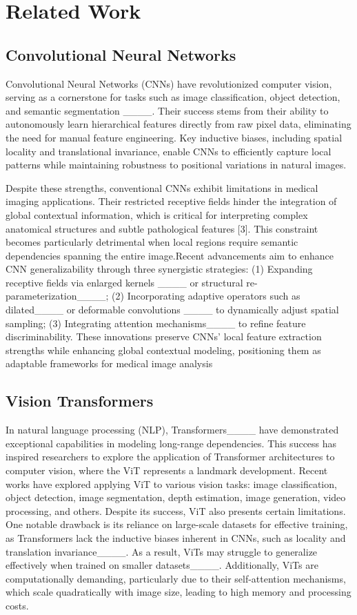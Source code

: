 \section{Related Work}
\label{sec:related}
\subsection{Convolutional Neural Networks}
Convolutional Neural Networks (CNNs) have revolutionized computer vision, serving as a cornerstone for tasks such as image classification, object detection, and semantic segmentation ____. Their success stems from their ability to autonomously learn hierarchical features directly from raw pixel data, eliminating the need for manual feature engineering. Key inductive biases, including spatial locality and translational invariance, enable CNNs to efficiently capture local patterns while maintaining robustness to positional variations in natural images.

Despite these strengths, conventional CNNs exhibit limitations in medical imaging applications. Their restricted receptive fields hinder the integration of global contextual information, which is critical for interpreting complex anatomical structures and subtle pathological features [3]. This constraint becomes particularly detrimental when local regions require semantic dependencies spanning the entire image.Recent advancements aim to enhance CNN generalizability through three synergistic strategies: (1) Expanding receptive fields via enlarged kernels ____ or structural re-parameterization____; (2) Incorporating adaptive operators such as dilated____ or deformable convolutions ____ to dynamically adjust spatial sampling; (3) Integrating attention mechanisms____ to refine feature discriminability. These innovations preserve CNNs' local feature extraction strengths while enhancing global contextual modeling, positioning them as adaptable frameworks for medical image analysis

\subsection{Vision Transformers}
In natural language processing (NLP), Transformers____ have demonstrated exceptional capabilities in modeling long-range dependencies. This success has inspired researchers to explore the application of Transformer architectures to computer vision, where the ViT represents a landmark development. Recent works have explored applying ViT to various vision tasks: image classification, object detection, image segmentation, depth estimation, image generation, video processing, and others. Despite its success, ViT also presents certain limitations. One notable drawback is its reliance on large-scale datasets for effective training, as Transformers lack the inductive biases inherent in CNNs, such as locality and translation invariance____. As a result, ViTs may struggle to generalize effectively when trained on smaller datasets____. Additionally, ViTs are computationally demanding, particularly due to their self-attention mechanisms, which scale quadratically with image size, leading to high memory and processing costs. 

